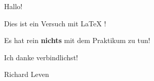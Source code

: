 \documentclass{scrartcl}
\begin{document}
Hallo!

Dies ist ein Versuch mit \LaTeX{} !

Es hat rein \textbf{nichts} mit dem Praktikum zu tun!

Ich danke verbindlichst!

Richard Leven
\end{document}
